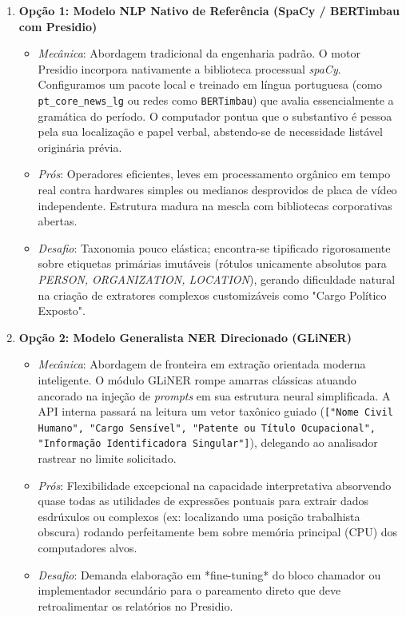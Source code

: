\documentclass{scrreprt}
\begin{document}
\begin{enumerate}
    \item \textbf{Opção 1: Modelo NLP Nativo de Referência (SpaCy / BERTimbau com Presidio)}
    \begin{itemize}
        \item \textit{Mecânica}: Abordagem tradicional da engenharia padrão. O motor Presidio incorpora nativamente a biblioteca processual \textit{spaCy}. Configuramos um pacote local e treinado em língua portuguesa (como \texttt{pt\_core\_news\_lg} ou redes como \texttt{BERTimbau}) que avalia essencialmente a gramática do período. O computador pontua que o substantivo é pessoa pela sua localização e papel verbal, abstendo-se de necessidade listável originária prévia.
        \item \textit{Prós}: Operadores eficientes, leves em processamento orgânico em tempo real contra hardwares simples ou medianos desprovidos de placa de vídeo independente. Estrutura madura na mescla com bibliotecas corporativas abertas.
        \item \textit{Desafio}: Taxonomia pouco elástica; encontra-se tipificado rigorosamente sobre etiquetas primárias imutáveis (rótulos unicamente absolutos para \textit{PERSON, ORGANIZATION, LOCATION}), gerando dificuldade natural na criação de extratores complexos customizáveis como "Cargo Político Exposto".
    \end{itemize}

    \item \textbf{Opção 2: Modelo Generalista NER Direcionado (GLiNER)}
    \begin{itemize}
        \item \textit{Mecânica}: Abordagem de fronteira em extração orientada moderna inteligente. O módulo GLiNER rompe amarras clássicas atuando ancorado na injeção de \textit{prompts} em sua estrutura neural simplificada. A API interna passará na leitura um vetor taxônico guiado (\texttt{["Nome Civil Humano", "Cargo Sensível", "Patente ou Título Ocupacional", "Informação Identificadora Singular"]}), delegando ao analisador rastrear no limite solicitado.
        \item \textit{Prós}: Flexibilidade excepcional na capacidade interpretativa absorvendo quase todas as utilidades de expressões pontuais para extrair dados esdrúxulos ou complexos (ex: localizando uma posição trabalhista obscura) rodando perfeitamente bem sobre memória principal (CPU) dos computadores alvos.
        \item \textit{Desafio}: Demanda elaboração em *fine-tuning* do bloco chamador ou implementador secundário para o pareamento direto que deve retroalimentar os relatórios no Presidio.
    \end{itemize}


\end{enumerate}
\end{document}
